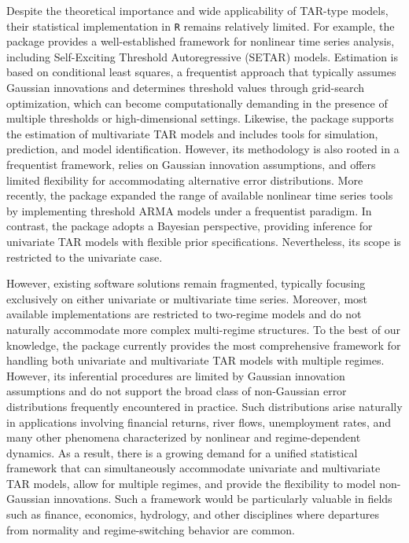 Despite the theoretical importance and wide applicability of TAR-type models, their statistical implementation in {\tt R} remains relatively limited. For example, the package  \citep{stigler2018tsdyn} provides a well-established framework for nonlinear time series analysis, including Self-Exciting Threshold Autoregressive (SETAR) models. Estimation is based on conditional least squares, a frequentist approach that typically assumes Gaussian innovations and determines threshold values through grid-search optimization, which can become computationally demanding in the presence of multiple thresholds or high-dimensional settings. Likewise, the package  \citep{liu2020nts} supports the estimation of multivariate TAR models and includes tools for simulation, prediction, and model identification. However, its methodology is also rooted in a frequentist framework, relies on Gaussian innovation assumptions, and offers limited flexibility for accommodating alternative error distributions. More recently, the package  \citep{tseriesTARMA} expanded the range of available nonlinear time series tools by implementing threshold ARMA models under a frequentist paradigm. In contrast, the package  \citep{BAYSTAR} adopts a Bayesian perspective, providing inference for univariate TAR models with flexible prior specifications. Nevertheless, its scope is restricted to the univariate case.

However, existing software solutions remain fragmented, typically focusing exclusively on either univariate or multivariate time series. Moreover, most available implementations are restricted to two-regime models and do not naturally accommodate more complex multi-regime structures. To the best of our knowledge, the  package currently provides the most comprehensive framework for handling both univariate and multivariate TAR models with multiple regimes. However, its inferential procedures are limited by Gaussian innovation assumptions and do not support the broad class of non-Gaussian error distributions frequently encountered in practice. Such distributions arise naturally in applications involving financial returns, river flows, unemployment rates, and many other phenomena characterized by nonlinear and regime-dependent dynamics. As a result, there is a growing demand for a unified statistical framework that can simultaneously accommodate univariate and multivariate TAR models, allow for multiple regimes, and provide the flexibility to model non-Gaussian innovations. Such a framework would be particularly valuable in fields such as finance, economics, hydrology, and other disciplines where departures from normality and regime-switching behavior are common.

